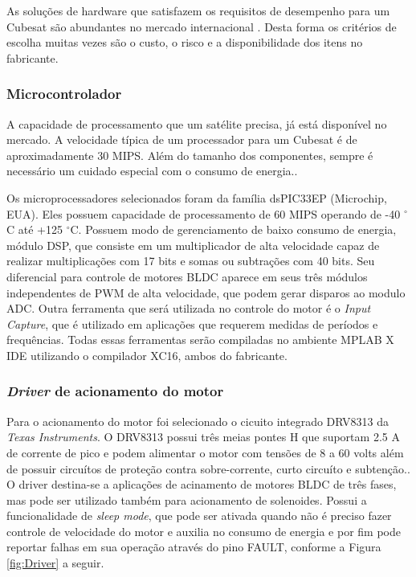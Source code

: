 \documentclass[
	12pt,				%
	openany,			%
	twoside,			%
	a4paper,			%
	english,			%
	french,				%
	spanish,			%
	brazil,				%
	oldfontcommands
	]{abntex2}
\begin{document}
As soluções de hardware que satisfazem os requisitos de desempenho para um Cubesat são abundantes no mercado internacional \cite{STATEOFART}. Desta forma os critérios de escolha muitas vezes são o custo, o risco e a disponibilidade dos itens no fabricante.


\subsubsection{Microcontrolador}

A capacidade de processamento que um satélite precisa, já está disponível no mercado. A velocidade típica de um processador para um Cubesat é de aproximadamente 30 MIPS. Além do tamanho dos componentes, sempre é necessário um cuidado especial com o consumo de energia.\cite{STATEOFART}.

Os microprocessadores selecionados foram da família dsPIC33EP (Microchip, EUA). Eles possuem capacidade de processamento de 60 MIPS operando de -40 $^{\circ}$C até +125 $^{\circ}$C. Possuem modo de gerenciamento de baixo consumo de energia, módulo DSP, que consiste em um multiplicador de alta velocidade capaz de realizar multiplicações com 17 bits e somas ou subtrações com 40 bits. Seu diferencial para controle de motores BLDC aparece em seus três módulos independentes de PWM de alta velocidade, que podem gerar disparos ao modulo ADC. Outra ferramenta que será utilizada no controle do motor é o \textit{Input Capture}, que é utilizado em aplicações que requerem medidas de períodos e frequências. \cite{dsPIC33EP}
Todas essas ferramentas serão compiladas no ambiente MPLAB X IDE utilizando o compilador XC16, ambos do fabricante.

\subsubsection{\textit{Driver} de acionamento do motor}

Para o acionamento do motor foi selecionado o cicuito integrado DRV8313 da \textit{Texas Instruments}. O DRV8313 possui três meias pontes H que suportam 2.5 A de corrente de pico e podem alimentar o motor com tensões de 8 a 60 volts além de possuir circuítos de proteção contra sobre-corrente, curto circuíto e subtenção.\cite{DRV8313}. O driver destina-se a aplicações de acinamento de motores BLDC de três fases, mas pode ser utilizado também para acionamento de solenoides. Possui a funcionalidade de \textit{sleep mode}, que pode ser ativada quando não é preciso fazer controle de velocidade do motor e auxilia no consumo de energia e por fim pode reportar falhas em sua operação através do pino FAULT, conforme a Figura \ref{fig:Driver} a seguir.
\end{document}

